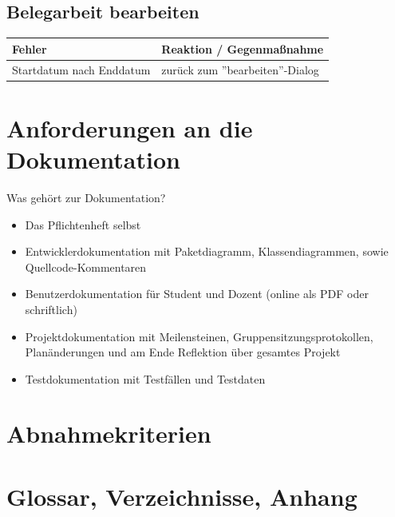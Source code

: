 \documentclass{article}
\begin{document}
\subsection{Belegarbeit bearbeiten}
\begin{tabular}{|p{7cm}|p{7cm}|}
\hline
	\textbf{Fehler}				&	\textbf{Reaktion / Gegenmaßnahme}	\\
\hline
\hline
	Startdatum nach Enddatum	&	zurück zum ''bearbeiten''-Dialog	\\
\hline
\end{tabular}

\section{Anforderungen an die Dokumentation}
Was gehört zur Dokumentation?
\begin{itemize}
\item Das Pflichtenheft selbst
\item Entwicklerdokumentation mit Paketdiagramm, Klassendiagrammen, sowie Quellcode-Kommentaren
\item Benutzerdokumentation für Student und Dozent (online als PDF oder schriftlich)
\item Projektdokumentation mit Meilensteinen, Gruppensitzungsprotokollen, Planänderungen und am Ende Reflektion über gesamtes Projekt
\item Testdokumentation mit Testfällen und Testdaten
\end{itemize}

\section{Abnahmekriterien}



\section{Glossar, Verzeichnisse, Anhang}
\end{document}

